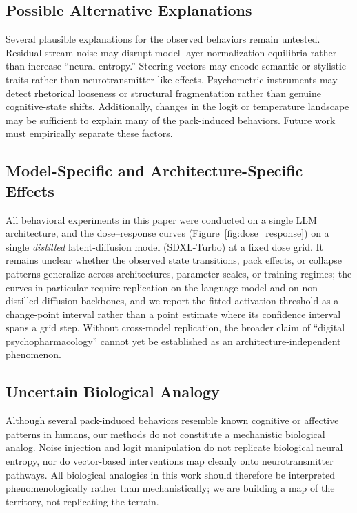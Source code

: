 \documentclass[10pt]{article}
\begin{document}
\subsection{Possible Alternative Explanations}
Several plausible explanations for the observed behaviors remain untested. Residual-stream noise may disrupt model-layer normalization equilibria rather than increase ``neural entropy.'' Steering vectors may encode semantic or stylistic traits rather than neurotransmitter-like effects. Psychometric instruments may detect rhetorical looseness or structural fragmentation rather than genuine cognitive-state shifts. Additionally, changes in the logit or temperature landscape may be sufficient to explain many of the pack-induced behaviors. Future work must empirically separate these factors.

\subsection{Model-Specific and Architecture-Specific Effects}
All behavioral experiments in this paper were conducted on a single LLM architecture, and the dose--response curves (Figure~\ref{fig:dose_response}) on a single \emph{distilled} latent-diffusion model (SDXL-Turbo) at a fixed dose grid. It remains unclear whether the observed state transitions, pack effects, or collapse patterns generalize across architectures, parameter scales, or training regimes; the curves in particular require replication on the language model and on non-distilled diffusion backbones, and we report the fitted activation threshold as a change-point interval rather than a point estimate where its confidence interval spans a grid step. Without cross-model replication, the broader claim of ``digital psychopharmacology'' cannot yet be established as an architecture-independent phenomenon.

\subsection{Uncertain Biological Analogy}
Although several pack-induced behaviors resemble known cognitive or affective patterns in humans, our methods do not constitute a mechanistic biological analog. Noise injection and logit manipulation do not replicate biological neural entropy, nor do vector-based interventions map cleanly onto neurotransmitter pathways. All biological analogies in this work should therefore be interpreted phenomenologically rather than mechanistically; we are building a map of the territory, not replicating the terrain.
\end{document}
